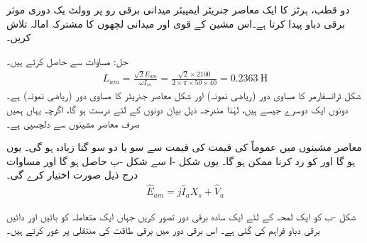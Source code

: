 دو قطب،  ہرٹز کا ایک معاصر جنریٹر  ایمپیئر میدانی برقی رو پر   وولٹ یک دوری موثر برقی دباو پیدا کرتا ہے۔اس مشین کے قوی اور میدانی لچھوں کا مشترکہ امالہ تلاش کریں۔

حل:\quad
	مساوات   سے   حاصل کرتے ہیں۔
\begin{align}
L_{am}=\frac{\sqrt{2} E_{am}}{\omega I_m}=\frac{\sqrt{2}  \times 2100}{2 \times \pi \times 50 \times 40}=\SI{0.2363}{\henry}
\end{align}
%
شکل  ٹرانسفارمر کا مساوی دور (ریاضی نمونہ) اور شکل  معاصر جنریٹر کا مساوی دور (ریاضی نمونہ) ہے۔ دونوں ایک دوسرے جیسے  ہیں، لہٰذا مندرجہ ذیل بیان دونوں کے لئے درست ہو گا، اگرچہ یہاں ہمیں صرف معاصر مشینوں سے دلچسپی ہے۔

معاصر مشینوں میں عموماً  کی قیمت   کی قیمت سے  سو یا دو سو گنا زیادہ ہو گی۔ یوں  ہو گا اور  کو رد کرنا ممکن ہو گا۔ یوں شکل -ا سے شکل -ب حاصل ہو گا اور مساوات  درج ذیل صورت اختیار کرے گی۔
\begin{align}\label{مساوات_معاصر_جنریٹر_دوری_سمتیہ_مساوات_سادہ}
\hat{E}_{am}= j \hat{I}_a X_s +\hat{V}_a
\end{align}

شکل -ب کو  ایک لمحہ کے لئے ایک سادہ برقی دور تصور کریں جہاں  ایک متعاملہ   کو بائیں   اور دائیں   برقی دباو فراہم کی گئی ہے۔ اس برقی دور میں برقی طاقت کی منتقلی پر غور کرتے ہیں۔

